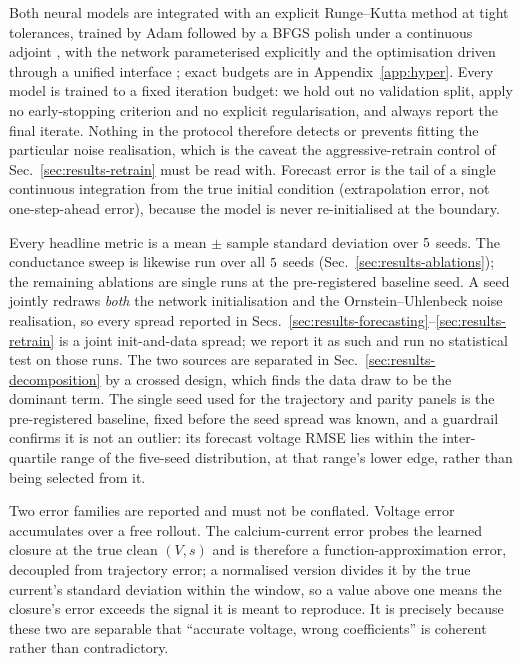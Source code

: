 \documentclass{article}
\begin{document}
Both neural models are integrated with an explicit Runge--Kutta method
\citep{rackauckas2017diffeq} at tight tolerances, trained by Adam followed by a
BFGS polish under a continuous adjoint \citep{ma2021comparison,
rackauckas2020universal}, with the network parameterised explicitly
\citep{pal2023lux} and the optimisation driven through a unified interface
\citep{dixit2023optimization}; exact budgets are in Appendix~\ref{app:hyper}.
Every model is trained to a fixed iteration budget: we hold out no validation
split, apply no early-stopping criterion and no explicit regularisation, and
always report the final iterate. Nothing in the protocol therefore detects or
prevents fitting the particular noise realisation, which is the caveat the
aggressive-retrain control of Sec.~\ref{sec:results-retrain} must be read with.
Forecast error is the tail of a single continuous integration from the true
initial condition (extrapolation error, not one-step-ahead error), because the
model is never re-initialised at the boundary.

Every headline metric is a mean $\pm$ sample standard deviation over
$5$ seeds. The conductance sweep is likewise run over all
$5$ seeds (Sec.~\ref{sec:results-ablations}); the remaining
ablations are single runs at the pre-registered baseline seed. A seed jointly redraws \emph{both} the network initialisation and
the Ornstein--Uhlenbeck noise realisation, so every spread reported in
Secs.~\ref{sec:results-forecasting}--\ref{sec:results-retrain} is a joint
init-and-data spread; we report it as such and run no statistical test on those
runs. The two sources are separated in Sec.~\ref{sec:results-decomposition} by a
crossed design, which finds the data draw to be the dominant term.
The single seed used for the trajectory and parity panels is the pre-registered
baseline, fixed before the seed spread was known, and a guardrail confirms it is
not an outlier: its forecast voltage RMSE lies within the inter-quartile range
of the five-seed distribution, at that range's lower edge, rather than being
selected from it.

Two error families are reported and must not be conflated. Voltage error
accumulates over a free rollout. The calcium-current error probes the learned
closure at the true clean $(V,s)$ and is therefore a function-approximation
error, decoupled from trajectory error; a normalised version divides it by the
true current's standard deviation within the window, so a value above one means
the closure's error exceeds the signal it is meant to reproduce. It is precisely
because these two are separable that ``accurate voltage, wrong coefficients'' is
coherent rather than contradictory.
\end{document}
